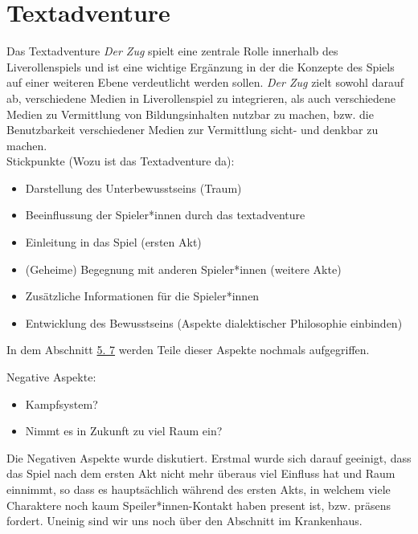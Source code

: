 \documentclass[12pt, a4paper, openany]{report}
\begin{document}
\chapter{Textadventure} \label{textadventure} 
Das Textadventure \textit{Der Zug} spielt eine zentrale Rolle innerhalb des Liverollenspiels und ist eine wichtige Ergänzung in der die Konzepte des Spiels auf einer weiteren Ebene verdeutlicht werden sollen. 
\textit{Der Zug} zielt sowohl darauf ab, verschiedene Medien in Liverollenspiel zu integrieren, als auch verschiedene Medien zu Vermittlung von Bildungsinhalten nutzbar zu machen, bzw. die Benutzbarkeit verschiedener Medien zur Vermittlung sicht- und denkbar zu machen.\\
Stickpunkte (Wozu ist das Textadventure da):
\begin{itemize}
\item Darstellung des Unterbewusstseins (Traum)
\item Beeinflussung der Spieler*innen durch das textadventure
\item Einleitung in das Spiel (ersten Akt)
\item (Geheime) Begegnung mit anderen Spieler*innen (weitere Akte)
\item Zusätzliche Informationen für die Spieler*innen
\item Entwicklung des Bewusstseins (Aspekte dialektischer Philosophie einbinden)
\end{itemize}
In dem Abschnitt \hyperref[txtad-anlehnung]{5. 7} werden Teile dieser Aspekte nochmals aufgegriffen.

Negative Aspekte:
\begin{itemize}
\item Kampfsystem?
\item Nimmt es in Zukunft zu viel Raum ein? 
\end{itemize}
Die Negativen Aspekte wurde diskutiert.
Erstmal wurde sich darauf geeinigt, dass das Spiel nach dem ersten Akt nicht mehr überaus viel Einfluss hat und Raum einnimmt, so dass es hauptsächlich während des ersten Akts, in welchem viele Charaktere noch kaum Speiler*innen-Kontakt haben present ist, bzw. präsens fordert.
Uneinig sind wir uns noch über den Abschnitt im Krankenhaus.\\
\end{document}
